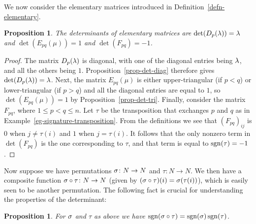 \documentclass[reqno]{amsart}
\newtheorem{proposition}[theorem]{Proposition}
\theoremstyle{definition}
\begin{document}
We now consider the elementary matrices introduced in
Definition~\ref{defn-elementary}.

\begin{proposition}\label{prop-det-elem}
 The determinants of elementary matrices are $\det(D_p(\lambda))=\lambda$ and
 $\det(E_{pq}(\mu))=1$ and $\det(F_{pq})=-1$.
\end{proposition}
\begin{proof}
 The matrix $D_p(\lambda)$ is diagonal, with one of the diagonal entries
 being $\lambda$, and all the others being $1$.
 Proposition~\ref{prop-det-diag} therefore gives $\det(D_p(\lambda))=\lambda$.
 Next, the matrix $E_{pq}(\mu)$ is either upper-triangular (if $p<q$)
 or lower-triangular (if $p>q$) and all the diagonal entries are equal
 to $1$, so $\det(E_{pq}(\mu))=1$ by Proposition~\ref{prop-det-tri}.
 Finally, consider the matrix $F_{pq}$, where $1\leq p<q\leq n$.  Let
 $\tau$ be the transposition that exchanges $p$ and $q$ as in
 Example~\ref{eg-signature-transposition}.  From the definitions we
 see that $(F_{pq})_{ij}$ is $0$ when $j\neq\tau(i)$ and $1$ when
 $j=\tau(i)$.  It follows that the only nonzero term in $\det(F_{pq})$
 is the one corresponding to $\tau$, and that term is equal to
 $\operatorname{sgn}(\tau)=-1$.
\end{proof}

Now suppose we have permutations $\sigma\colon N\to N$ and $\tau\colon N\to N$.  We
then have a composite function $\sigma\circ\tau\colon N\to N$ (given by
$(\sigma\circ\tau)(i)=\sigma(\tau(i))$), which is easily seen to be another
permutation. The following fact is crucial for understanding the
properties of the determinant:
\begin{proposition}\label{prop-sgn-circ}
 For $\sigma$ and $\tau$ as above we have
 $\operatorname{sgn}(\sigma\circ\tau)=\operatorname{sgn}(\sigma)\operatorname{sgn}(\tau)$.
\end{proposition}
\end{document}

